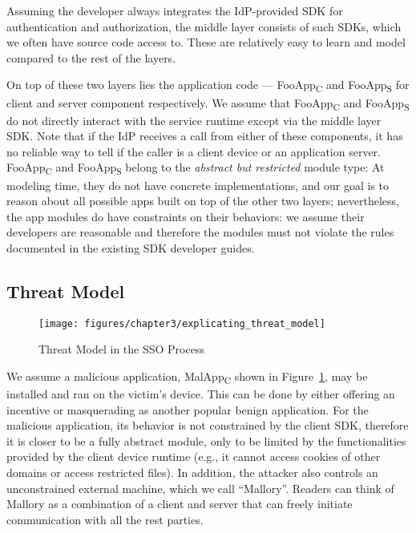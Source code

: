 Assuming the developer always integrates the IdP-provided SDK for authentication and authorization, the middle layer consists of such SDKs, which we often have source code access to.  These are relatively easy to learn and model compared to the rest of the layers.

On top of these two layers lies the application code --- FooApp\textsubscript{C} and FooApp\textsubscript{S} for client and server component respectively.  We assume that FooApp\textsubscript{C} and FooApp\textsubscript{S} do not directly interact with the service runtime except via the middle layer SDK.  Note that if the IdP receives a call from either of these components, it has no reliable way to tell if the caller is a client device or an application server.  FooApp\textsubscript{C} and FooApp\textsubscript{S} belong to the \emph{abstract but restricted} module type:  At modeling time, they do not have concrete implementations, and our goal is to reason about all possible apps built on top of the other two layers; nevertheless, the app modules do have constraints on their behaviors: we assume their developers are reasonable and therefore the modules must not violate the rules documented in the existing SDK developer guides.

\subsection{Threat Model}

\begin{figure}[hbt]
\centering
\texttt{[image: figures/chapter3/explicating\_threat\_model]}
\caption{Threat Model in the SSO Process}
\label{fig:explicating_threat_model}
\end{figure}

We assume a malicious application, MalApp\textsubscript{C} shown in Figure~\ref{fig:explicating_threat_model}, may be installed and ran on the victim's device.  This can be done by either offering an incentive or masquerading as another popular benign application.  For the malicious application, its behavior is not constrained by the client SDK, therefore it is closer to be a fully abstract module, only to be limited by the functionalities provided by the client device runtime (e.g., it cannot access cookies of other domains or access restricted files).  In addition, the attacker also controls an unconstrained external machine, which we call ``Mallory''. Readers can think of Mallory as a combination of a client and server that can freely initiate communication with all the rest parties. 


